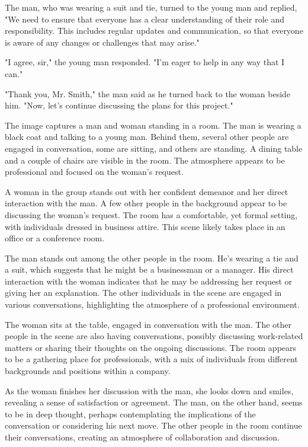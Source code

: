 \documentclass[smalldemyvopaper,11pt,twoside,onecolumn,openright,extrafontsizes]{memoir}
\begin{document}
The man, who was wearing a suit and tie, turned to the young man and replied, "We need to ensure that everyone has a clear understanding of their role and responsibility. This includes regular updates and communication, so that everyone is aware of any changes or challenges that may arise."\par
"I agree, sir," the young man responded. "I'm eager to help in any way that I can."\par
"Thank you, Mr. Smith," the man said as he turned back to the woman beside him. "Now, let's continue discussing the plans for this project."\par
The image captures a man and woman standing in a room. The man is wearing a black coat and talking to a young man. Behind them, several other people are engaged in conversation, some are sitting, and others are standing. A dining table and a couple of chairs are visible in the room. The atmosphere appears to be professional and focused on the woman's request.\par
A woman in the group stands out with her confident demeanor and her direct interaction with the man. A few other people in the background appear to be discussing the woman's request. The room has a comfortable, yet formal setting, with individuals dressed in business attire. This scene likely takes place in an office or a conference room.\par
The man stands out among the other people in the room. He's wearing a tie and a suit, which suggests that he might be a businessman or a manager. His direct interaction with the woman indicates that he may be addressing her request or giving her an explanation. The other individuals in the scene are engaged in various conversations, highlighting the atmosphere of a professional environment.\par
The woman sits at the table, engaged in conversation with the man. The other people in the scene are also having conversations, possibly discussing work-related matters or sharing their thoughts on the ongoing discussions. The room appears to be a gathering place for professionals, with a mix of individuals from different backgrounds and positions within a company.\par
As the woman finishes her discussion with the man, she looks down and smiles, revealing a sense of satisfaction or agreement. The man, on the other hand, seems to be in deep thought, perhaps contemplating the implications of the conversation or considering his next move. The other people in the room continue their conversations, creating an atmosphere of collaboration and discussion.\par
\end{document}
